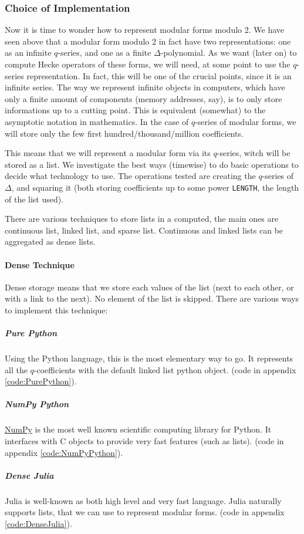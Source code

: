 \subsubsection{Choice of Implementation}
Now it is time to wonder how to represent modular forms modulo 2.
We have seen above that a modular form modulo 2 in fact have two representations: one as an infinite $q$-series, and one as a finite $\Delta$-polynomial.
As we want (later on) to compute Hecke operators of these forms, we will need, at some point to use the $q$-series representation.
In fact, this will be one of the crucial points, since it is an infinite series.
The way we represent infinite objects in computers, which have only a finite amount of components (memory addresses, say), is to only store informations up to a cutting point.
This is equivalent (somewhat) to the asymptotic notation in mathematics.
In the case of $q$-series of modular forms, we will store only the few first hundred/thousand/million coefficients.

This means that we will represent a modular form via its $q$-series, witch will be stored as a list.
We investigate the best ways (timewise) to do basic operations to decide what technology to use.
The operations tested are creating the $q$-series of $\Delta$, and squaring it (both storing coefficients up to some power \texttt{LENGTH}, the length of the list used).

There are various techniques to store lists in a computed, the main ones are continuous list, linked list, and sparse list.
Continuous and linked lists can be aggregated as dense lists.

\paragraph{Dense Technique}
Dense storage means that we store each values of the list (next to each other, or with a link to the next).
No element of the list is skipped.
There are various ways to implement this technique:
\subparagraph{Pure Python}
Using the Python language, this is the most elementary way to go.
It represents all the $q$-coefficients with the default linked list python object.
(code in appendix \ref{code:PurePython}).
\subparagraph{NumPy Python}
\href{https://fr.wikipedia.org/wiki/NumPy}{NumPy} is the most well known scientific computing library for Python.
It interfaces with C objects to provide very fast features (such as lists).
(code in appendix \ref{code:NumPyPython}).
\subparagraph{Dense Julia}
Julia is well-known as both high level and very fast language.
Julia naturally supports lists, that we can use to represent modular forms.
(code in appendix \ref{code:DenseJulia}).

